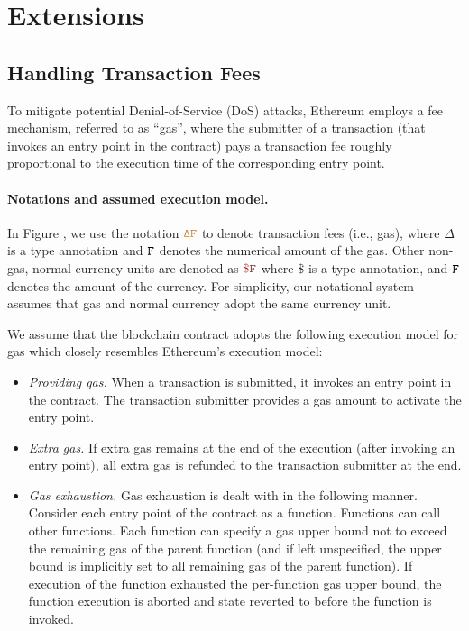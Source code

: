 \section{Extensions}

\subsection{Handling Transaction Fees}

To mitigate potential Denial-of-Service (DoS) attacks, 
Ethereum employs a fee mechanism, referred to as ``gas'', 
where the submitter of a transaction (that invokes
an entry point in the contract) pays a  
transaction fee
roughly proportional to the execution time of the 
corresponding entry point.

\paragraph{Notations and assumed execution model.}
In Figure , we
use the notation $\tt {\color{brown} \Delta F }$
to denote transaction fees (i.e., gas), 
where $\Delta$ is a type annotation 
and ${\tt F}$ denotes the numerical amount of the  
gas. Other non-gas, normal currency units 
are denoted as $\smaroon{\$ F}$ where $\$$ is a type annotation,
and ${\tt F}$ denotes the amount of the currency. 
For simplicity, our notational system assumes 
that gas and normal currency adopt
the same currency unit. 

We assume that the blockchain contract adopts the following execution model
for gas which closely resembles Ethereum's execution model:
\begin{itemize}[leftmargin=5mm]
\item
{\it Providing gas.} 
When a transaction is submitted, it invokes an entry point in the contract.
The transaction submitter provides a gas amount to activate the entry point. 
\item
{\it Extra gas.} 
If extra gas remains at the end of the execution (after invoking an entry point),
all extra gas is refunded to the transaction submitter at the end.
\item
{\it Gas exhaustion.} 
Gas exhaustion is dealt with in the following manner.
Consider each entry point of the contract as a function. 
Functions can call other functions.
Each function can specify a gas upper bound not to exceed
the remaining gas of the parent function (and if left unspecified,
the upper bound is implicitly set to all remaining gas of the parent function).
If execution of the function exhausted the per-function gas 
upper bound, the function execution is aborted and 
state reverted to before the function is invoked.
\end{itemize}





